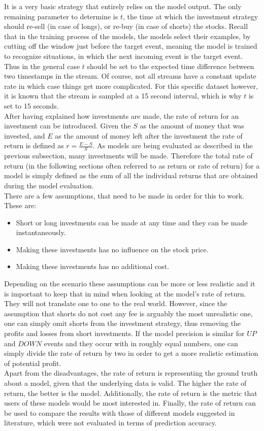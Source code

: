 It is a very basic strategy that entirely relies on the model output. The only remaining parameter to determine is $t$, the time at which the investment strategy should re-sell (in case of longs), or re-buy (in case of shorts) the stocks. Recall that in the training process of the models, the models select their examples, by cutting off the window just before the target event, meaning the model is trained to recognize situations, in which the next incoming event is the target event. Thus in the general case $t$ should be set to the expected time difference between two timestamps in the stream. Of course, not all streams have a constant update rate in which case things get more complicated. For this specific dataset however, it is known that the stream is sampled at a 15 second interval, which is why $t$ is set to 15 seconds. \\
After having explained how investments are made, the rate of return for an investment can be introduced. Given the $S$ as the amount of money that was invested, and $E$ as the amount of money left after the investment the rate of return is defined as $r = \frac{E-S}{S}$. As models are being evaluated as described in the previous subsection, many investments will be made. Therefore the total rate of return (in the following sections often referred to as return or rate of return) for a model is simply defined as the sum of all the individual returns that are obtained during the model evaluation.\\
There are a few assumptions, that need to be made in order for this to work. These are:

\begin{itemize}
	\item Short or long investments can be made at any time and they can be made instantaneously.
	\item Making these investments has no influence on the stock price.
	\item Making these investments has no additional cost.
\end{itemize}

Depending on the scenario these assumptions can be more or less realistic and it is important to keep that in mind when looking at the model's rate of return. They will not translate one to one to the real world. However, since the assumption that shorts do not cost any fee is arguably the most unrealistic one, one can simply omit shorts from the investment strategy, thus removing the profits and losses from short investments. If the model precision is similar for $UP$ and $DOWN$ events and they occur with in roughly equal numbers, one can simply divide the rate of return by two in order to get a more realistic estimation of potential profit.\\
Apart from the disadvantages, the rate of return is representing the ground truth about a model, given that the underlying data is valid. The higher the rate of return, the better is the model. Additionally, the rate of return is the metric that users of these models would be most interested in. Finally, the rate of return can be used to compare the results with those of different models suggested in literature, which were not evaluated in terms of prediction accuracy.

